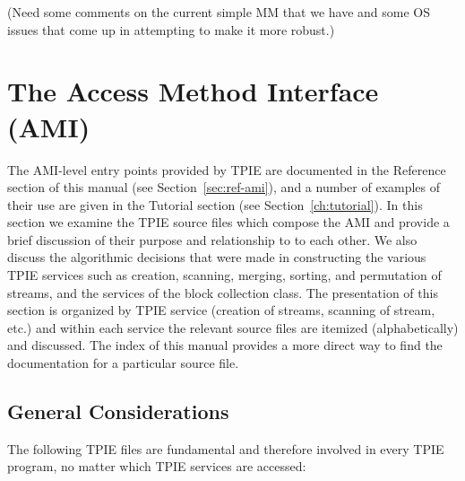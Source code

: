 (Need some comments on the current simple MM that we have and some OS issues
that come up in attempting to make it more robust.)



\section{The Access Method Interface (AMI)}

The AMI-level entry points provided by TPIE are documented
in the Reference section of this manual (see
Section~\ref{sec:ref-ami}), and a number of examples of
their use are given in the Tutorial section (see
Section~\ref{ch:tutorial}).  In this section we examine the
TPIE source files which compose the AMI and provide a brief
discussion of their purpose and relationship to to each
other. We also discuss the algorithmic decisions that were
made in constructing the various TPIE services such as
creation, scanning, merging, sorting, and permutation of
streams, and the services of the block collection class. The
presentation of this section is organized by TPIE service
(creation of streams, scanning of stream, etc.) and within
each service the relevant source files are itemized
(alphabetically) and discussed. The index of this manual
provides a more direct way to find the documentation for a
particular source file.

\subsection{General Considerations}

The following TPIE files are fundamental and therefore
involved in every TPIE program, no matter which TPIE
services are accessed:

